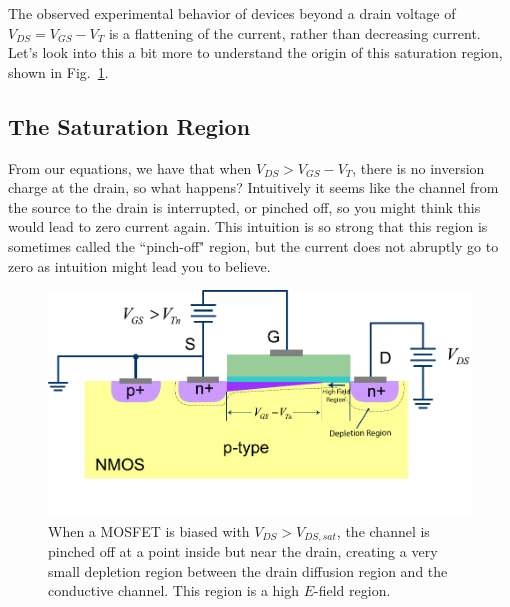 The observed experimental behavior of devices beyond a drain voltage of $V_{DS} = V_{GS} - V_T$ is a flattening of the current, rather than decreasing current.  Let's look into this a bit more to understand the origin of this saturation region, shown in Fig.~\ref{fig:mos_current_sat}.


\subsection{The Saturation Region}


From our equations, we have that when $V_{DS} > V_{GS} - V_T$, there is no inversion charge at the drain, so what happens? Intuitively it seems like the channel from the source to the drain is interrupted, or pinched off, so you might think this would lead to zero current again.  This intuition is so strong that this region is sometimes called the ``pinch-off" region, but the current does not abruptly go to zero as intuition might lead you to believe.  
 




\begin{figure}[tb]
\begin{center}
\includegraphics[width=.75\columnwidth]{mos_current_sat}
\end{center}
\caption{When a MOSFET is biased with $V_{DS} > V_{DS,sat}$, the channel is pinched off at a point inside but near the drain, creating a very small depletion region between the drain diffusion region and the conductive channel.  This region is a high $E$-field region.} \label{fig:mos_current_sat}
\end{figure}

